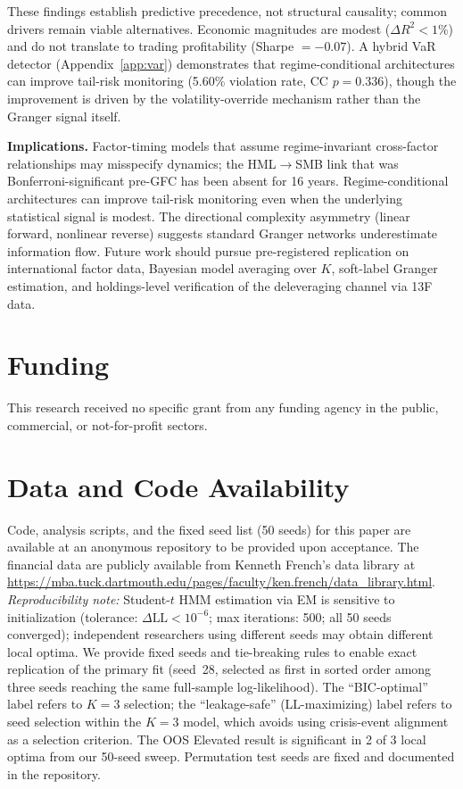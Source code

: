 \documentclass[sigconf,anonymous]{acmart}
\begin{document}
These findings establish predictive precedence, not structural causality; common drivers remain viable alternatives. Economic magnitudes are modest ($\Delta R^2 < 1\%$) and do not translate to trading profitability (Sharpe $= -0.07$). A hybrid VaR detector (Appendix~\ref{app:var}) demonstrates that regime-conditional architectures can improve tail-risk monitoring (5.60\% violation rate, CC $p = 0.336$), though the improvement is driven by the volatility-override mechanism rather than the Granger signal itself.

\textbf{Implications.}
Factor-timing models that assume regime-invariant cross-factor
relationships may misspecify dynamics; the HML$\to$SMB link that was
Bonferroni-significant pre-GFC has been absent for 16 years.
Regime-conditional architectures can improve tail-risk monitoring even when
the underlying statistical signal is modest.
The directional complexity asymmetry (linear forward, nonlinear reverse)
suggests standard Granger networks underestimate information flow.
Future work should pursue pre-registered replication on international factor
data, Bayesian model averaging over $K$, soft-label Granger estimation,
and holdings-level verification of the deleveraging channel via 13F data.

\section*{Funding}

This research received no specific grant from any funding agency in the public,
commercial, or not-for-profit sectors.

\section*{Data and Code Availability}

Code, analysis scripts, and the fixed seed list (50 seeds) for this paper are available at an anonymous repository to be provided upon acceptance. The financial data are publicly available from Kenneth French's data library at \url{https://mba.tuck.dartmouth.edu/pages/faculty/ken.french/data_library.html}. \emph{Reproducibility note:} Student-$t$ HMM estimation via EM is sensitive to initialization (tolerance: $\Delta\text{LL} < 10^{-6}$; max iterations: 500; all 50 seeds converged); independent researchers using different seeds may obtain different local optima. We provide fixed seeds and tie-breaking rules to enable exact replication of the primary fit (seed~28, selected as first in sorted order among three seeds reaching the same full-sample log-likelihood). The ``BIC-optimal'' label refers to $K = 3$ selection; the ``leakage-safe'' (LL-maximizing) label refers to seed selection within the $K = 3$ model, which avoids using crisis-event alignment as a selection criterion. The OOS Elevated result is significant in 2 of 3 local optima from our 50-seed sweep. Permutation test seeds are fixed and documented in the repository.
\end{document}
